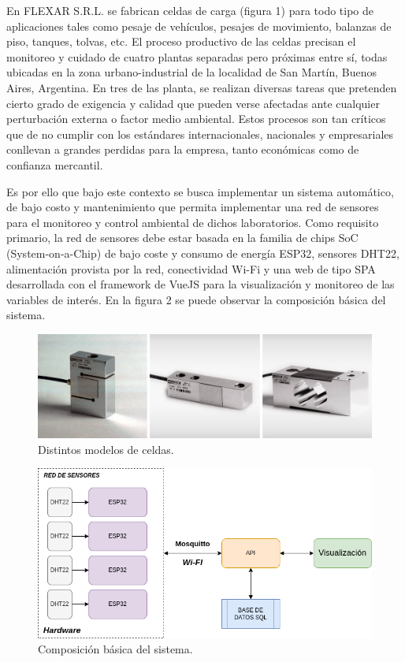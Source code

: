 \documentclass[
11pt, %
codirector, %
]{charter}
\begin{document}
En FLEXAR S.R.L. se fabrican celdas de carga (figura 1) para todo tipo de aplicaciones tales como pesaje de vehículos, pesajes de movimiento, balanzas de piso, tanques, tolvas, etc. El proceso productivo de las celdas precisan el monitoreo y cuidado de cuatro plantas separadas pero próximas entre sí, todas ubicadas en la zona urbano-industrial de la localidad de San Martín, Buenos Aires, Argentina. En tres de las planta, se realizan diversas tareas que pretenden cierto grado de exigencia y calidad que pueden verse afectadas ante cualquier perturbación externa o factor medio ambiental. Estos procesos son tan críticos que de no cumplir con los estándares internacionales, nacionales y empresariales conllevan a grandes perdidas para la empresa, tanto económicas como de confianza mercantil. 

Es por ello que bajo este contexto se busca implementar un sistema automático, de bajo costo y mantenimiento que permita implementar una red de sensores para el monitoreo y control ambiental de dichos laboratorios. Como requisito primario, la red de sensores debe estar basada en la familia de chips SoC (System-on-a-Chip) de bajo coste y consumo de energía ESP32, sensores DHT22, alimentación provista por la red, conectividad Wi-Fi y una web de tipo SPA desarrollada con el framework de VueJS para la visualización y monitoreo de las variables de interés. En la figura 2 se puede observar la composición básica del sistema.

\begin{figure}[h!]
\centering 
\includegraphics[width=.8\textwidth]{./Figuras/Celdas.png}
\caption{Distintos modelos de celdas.}
\label{fig:descripcion}
\end{figure}

\begin{figure}[h!]
\centering 
\includegraphics[width=.8\textwidth]{./Figuras/CompoBasica.png}
\caption{Composición básica del sistema.}
\label{fig:descripcion}
\end{figure}
\end{document}
